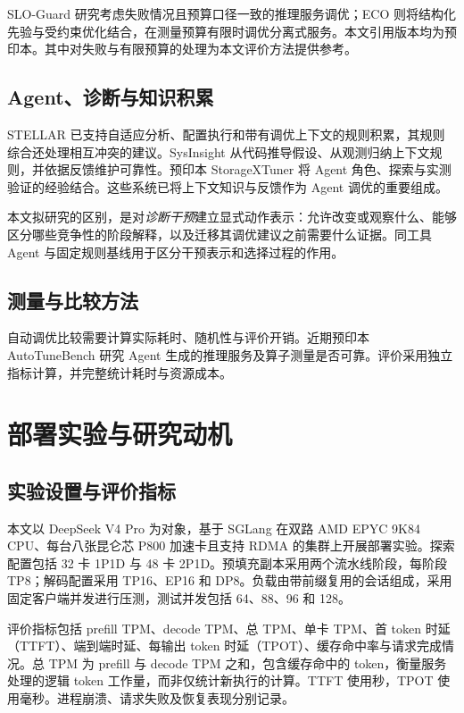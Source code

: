 \documentclass[preprint,12pt]{elsarticle}
\begin{document}
SLO-Guard 研究考虑失败情况且预算口径一致的推理服务调优；ECO 则将结构化先验与受约束优化结合，在测量预算有限时调优分离式服务\cite{sloguard2026,ecotuning2026}。本文引用版本均为预印本。其中对失败与有限预算的处理为本文评价方法提供参考。

\subsection{Agent、诊断与知识积累}
STELLAR 已支持自适应分析、配置执行和带有调优上下文的规则积累，其规则综合还处理相互冲突的建议\cite{stellar2025}。SysInsight 从代码推导假设、从观测归纳上下文规则，并依据反馈维护可靠性\cite{sysinsight2026}。预印本 StorageXTuner 将 Agent 角色、探索与实测验证的经验结合\cite{storagextuner2025}。这些系统已将上下文知识与反馈作为 Agent 调优的重要组成。

本文拟研究的区别，是对\emph{诊断干预}建立显式动作表示：允许改变或观察什么、能够区分哪些竞争性的阶段解释，以及迁移其调优建议之前需要什么证据。同工具 Agent 与固定规则基线用于区分干预表示和选择过程的作用。

\subsection{测量与比较方法}
自动调优比较需要计算实际耗时、随机性与评价开销\cite{methodology2024}。近期预印本 AutoTuneBench 研究 Agent 生成的推理服务及算子测量是否可靠\cite{autotunebench2026}。评价采用独立指标计算，并完整统计耗时与资源成本。

\section{部署实验与研究动机}
\label{sec:historical}
\subsection{实验设置与评价指标}
本文以 DeepSeek V4 Pro 为对象，基于 SGLang 在双路 AMD EPYC 9K84 CPU、每台八张昆仑芯 P800 加速卡且支持 RDMA 的集群上开展部署实验。探索配置包括 32 卡 1P1D 与 48 卡 2P1D。预填充副本采用两个流水线阶段，每阶段 TP8；解码配置采用 TP16、EP16 和 DP8。负载由带前缀复用的会话组成，采用固定客户端并发进行压测，测试并发包括 64、88、96 和 128。

评价指标包括 prefill TPM、decode TPM、总 TPM、单卡 TPM、首 token 时延（TTFT）、端到端时延、每输出 token 时延（TPOT）、缓存命中率与请求完成情况。总 TPM 为 prefill 与 decode TPM 之和，包含缓存命中的 token，衡量服务处理的逻辑 token 工作量，而非仅统计新执行的计算。TTFT 使用秒，TPOT 使用毫秒。进程崩溃、请求失败及恢复表现分别记录。
\end{document}
